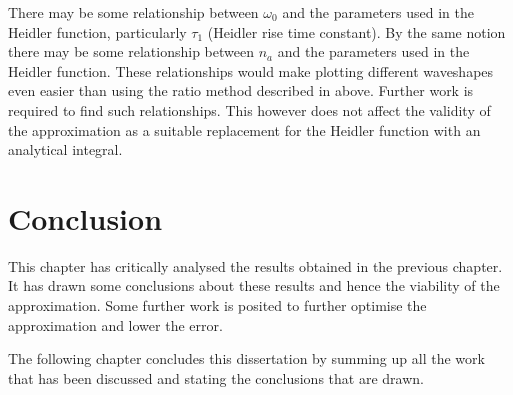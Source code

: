 There may be some relationship between $\omega_0$ and the parameters used in the Heidler function, particularly $\tau_1$ (Heidler rise time constant). By the same notion there may be some relationship between $n_a$ and the parameters used in the Heidler function. These relationships would make plotting different waveshapes even easier than using the ratio method described in  above. Further work is required to find such relationships. This however does not affect the validity of the approximation as a suitable replacement for the Heidler function with an analytical integral.


\section{Conclusion}
\label{sec:discussion_conclusion}
This chapter has critically analysed the results obtained in the previous chapter. It has drawn some conclusions about these results and hence the viability of the approximation. Some further work is posited to further optimise the approximation and lower the error.

The following chapter concludes this dissertation by summing up all the work that has been discussed and stating the conclusions that are drawn.

